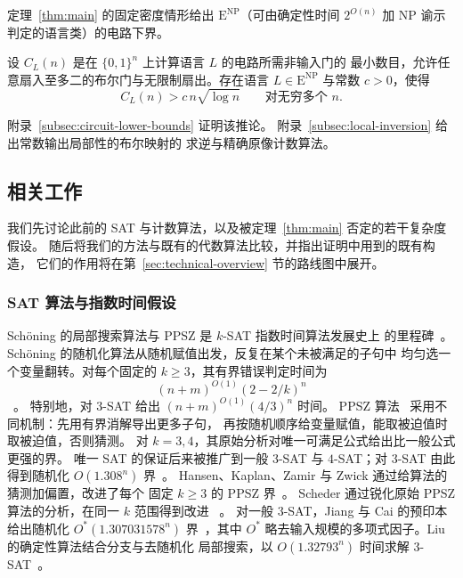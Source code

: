 定理~\ref{thm:main} 的固定密度情形给出
$\mathrm E^{\mathrm{NP}}$（可由确定性时间 $2^{O(n)}$ 加 NP 谕示
判定的语言类）的电路下界。

\begin{corollary}\label{cor:quantitative-circuits}
设 $C_L(n)$ 是在 $\{0,1\}^n$ 上计算语言 $L$ 的电路所需非输入门的
最小数目，允许任意扇入至多二的布尔门与无限制扇出。存在语言
$L\in\mathrm E^{\mathrm{NP}}$ 与常数 $c>0$，使得
\begin{equation}\label{eq:quantitative-circuit-lower-bound}
 C_L(n)>c\,n\sqrt{\log n}\qquad\text{对无穷多个 }n.
\end{equation}
\end{corollary}

附录~\ref{subsec:circuit-lower-bounds} 证明该推论。
附录~\ref{subsec:local-inversion} 给出常数输出局部性的布尔映射的
求逆与精确原像计数算法。

\subsection{相关工作}\label{sec:related}
我们先讨论此前的 SAT 与计数算法，以及被定理~\ref{thm:main}
否定的若干复杂度假设。
随后将我们的方法与既有的代数算法比较，并指出证明中用到的既有构造，
它们的作用将在第~\ref{sec:technical-overview} 节的路线图中展开。

\subsubsection{SAT 算法与指数时间假设}\label{subsec:related-sat}
Sch\"oning 的局部搜索算法与 PPSZ 是 $k$-SAT 指数时间算法发展史上
的里程碑~\cite{Schon99,PPSZ05}。
Sch\"oning 的随机化算法从随机赋值出发，反复在某个未被满足的子句中
均匀选一个变量翻转。对每个固定的 $k\ge3$，其有界错误判定时间为
\[
 (n+m)^{O(1)}(2-2/k)^n
\]
~\cite[Section~2]{Schon99}。
特别地，对 $3$-SAT 给出 $(n+m)^{O(1)}(4/3)^n$ 时间。
PPSZ 算法~\cite{PPSZ05} 采用不同机制：先用有界消解导出更多子句，
再按随机顺序给变量赋值，能取被迫值时取被迫值，否则猜测。
对 $k=3,4$，其原始分析对唯一可满足公式给出比一般公式更强的界。
唯一 SAT 的保证后来被推广到一般 $3$-SAT 与 $4$-SAT；对 $3$-SAT
由此得到随机化 $O(1.308^n)$ 界~\cite{Hertli14}。
Hansen、Kaplan、Zamir 与 Zwick 通过给算法的猜测加偏置，改进了每个
固定 $k\ge3$ 的 PPSZ 界~\cite{HKZZ19}。
Scheder 通过锐化原始 PPSZ 算法的分析，在同一 $k$ 范围得到改进
~\cite[Theorem~1.5]{Scheder24}。
对一般 $3$-SAT，Jiang 与 Cai 的预印本给出随机化
$O^*(1.307031578^n)$ 界~\cite[Corollary~1.2]{JC26}，其中 $O^*$
略去输入规模的多项式因子。Liu 的确定性算法结合分支与去随机化
局部搜索，以 $O(1.32793^n)$ 时间求解 $3$-SAT~\cite[Theorem~21]{Liu18}。

